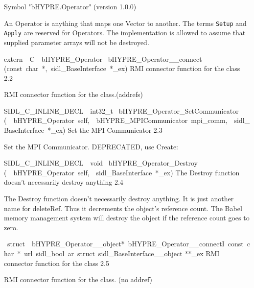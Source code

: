 \documentclass{article}
\begin{document}
\begin{cxxentry}
\begin{cxxvariable}
\begin{cxxdoc}
Symbol "bHYPRE.Operator" (version 1.0.0)

An Operator is anything that maps one Vector to another.  The
terms {\tt Setup} and {\tt Apply} are reserved for Operators.
The implementation is allowed to assume that supplied parameter
arrays will not be destroyed.
\end{cxxdoc}
\end{cxxvariable}
\begin{cxxfunction}
{extern\ \ C\ \ bHYPRE\_Operator\ }
        {bHYPRE\_Operator\_\_connect}
        {(const\ char\ *,\ sidl\_BaseInterface\ *\_ex)}
        {
RMI connector function for the class}
        {2.2}
\begin{cxxdoc}

RMI connector function for the class.(addrefs)
\end{cxxdoc}
\end{cxxfunction}
\begin{cxxfunction}
{SIDL\_C\_INLINE\_DECL\ \ int32\_t\ }
        {bHYPRE\_Operator\_SetCommunicator}
        {(\ \ bHYPRE\_Operator\ self,\ \ bHYPRE\_MPICommunicator\ mpi\_comm,\ \ sidl\_BaseInterface\ *\_ex)}
        {
Set the MPI Communicator}
        {2.3}
\begin{cxxdoc}

Set the MPI Communicator.
DEPRECATED, use Create:
\end{cxxdoc}
\end{cxxfunction}
\begin{cxxfunction}
{SIDL\_C\_INLINE\_DECL\ \ void\ }
        {bHYPRE\_Operator\_Destroy}
        {(\ \ bHYPRE\_Operator\ self,\ \ sidl\_BaseInterface\ *\_ex)}
        {
The Destroy function doesn't necessarily destroy anything}
        {2.4}
\begin{cxxdoc}

The Destroy function doesn't necessarily destroy anything.
It is just another name for deleteRef.  Thus it decrements the
object's reference count.  The Babel memory management system will
destroy the object if the reference count goes to zero.
\end{cxxdoc}
\end{cxxfunction}
\begin{cxxvariable}
{\ struct\ \ bHYPRE\_Operator\_\_object*\ bHYPRE\_Operator\_\_connectI\ const\ char\ *\ url\ sidl\_bool\ ar\ struct\ sidl\_BaseInterface\_\_object}
        {**\_ex}
        {}
        {
RMI connector function for the class}
        {2.5}
\begin{cxxdoc}

RMI connector function for the class. (no addref)
\end{cxxdoc}
\end{cxxvariable}
\end{cxxentry}
\end{document}
